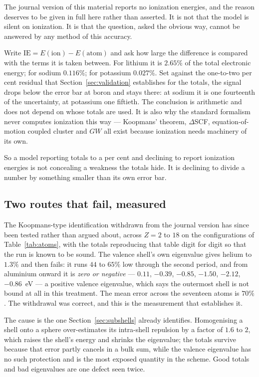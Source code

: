 The journal version of this material reports no ionization energies, and the reason deserves to be
given in full here rather than asserted. It is not that the model is silent on ionization. It is
that the question, asked the obvious way, cannot be answered by any method of this accuracy.

Write $\mathrm{IE} = E(\mathrm{ion}) - E(\mathrm{atom})$ and ask how large the difference is
compared with the terms it is taken between. For lithium it is $2.65\%$ of the total electronic
energy; for sodium $0.116\%$; for potassium $0.027\%$. Set against the one-to-two per cent
residual that Section~\ref{sec:validation} establishes for the totals, the signal drops below the
error bar at boron and stays there: at sodium it is one fourteenth of the uncertainty, at
potassium one fiftieth. The conclusion is arithmetic and does not depend on whose totals are
used. It is also why the standard formalism never computes ionization this way --- Koopmans'
theorem, $\Delta$SCF, equation-of-motion coupled cluster and $GW$ all exist because ionization
needs machinery of its own.

So a model reporting totals to a per cent and declining to report ionization energies is not
concealing a weakness the totals hide. It is declining to divide a number by something smaller
than its own error bar.

\subsection*{Two routes that fail, measured}

The Koopmans-type identification withdrawn from the journal version has since been tested rather
than argued about, across $Z=2$ to $18$ on the configurations of
Table~\ref{tab:atoms}, with the totals reproducing that table digit for digit so that the run is
known to be sound. The valence shell's own eigenvalue gives helium to $1.3\%$ and then fails: it
runs $44$ to $65\%$ low through the second period, and from aluminium onward it is \emph{zero or
negative} --- $0.11$, $-0.39$, $-0.85$, $-1.50$, $-2.12$, $-0.86$~eV --- a positive valence
eigenvalue, which says the outermost shell is not bound at all in this treatment. The mean error
across the seventeen atoms is $70\%$. The withdrawal was correct, and this is the measurement that
establishes it.

The cause is the one Section~\ref{sec:subshells} already identifies. Homogenising a shell onto a
sphere over-estimates its intra-shell repulsion by a factor of $1.6$ to $2$, which raises the
shell's energy and shrinks the eigenvalue; the totals survive because that error partly cancels in
a bulk sum, while the valence eigenvalue has no such protection and is the most exposed quantity
in the scheme. Good totals and bad eigenvalues are one defect seen twice.

